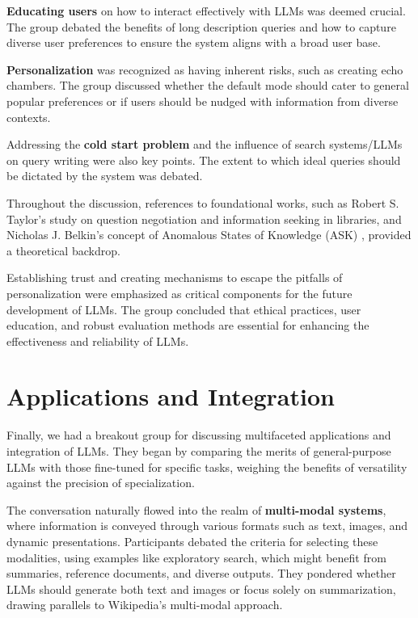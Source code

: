 \documentclass[11pt,dvipdfm]{article}
\begin{document}
{\bf Educating users} on how to interact effectively with LLMs was deemed crucial. The group debated the benefits of long description queries and how to capture diverse user preferences to ensure the system aligns with a broad user base.

{\bf Personalization} was recognized as having inherent risks, such as creating echo chambers. The group discussed whether the default mode should cater to general popular preferences or if users should be nudged with information from diverse contexts.

Addressing the {\bf cold start problem} and the influence of search systems/LLMs on query writing were also key points. The extent to which ideal queries should be dictated by the system was debated.

Throughout the discussion, references to foundational works, such as Robert S. Taylor's study on question negotiation \cite{taylor1968question} and information seeking in libraries, and Nicholas J. Belkin's concept of Anomalous States of Knowledge (ASK) \cite{belkin1980anomalous}, provided a theoretical backdrop.

Establishing trust and creating mechanisms to escape the pitfalls of personalization were emphasized as critical components for the future development of LLMs. The group concluded that ethical practices, user education, and robust evaluation methods are essential for enhancing the effectiveness and reliability of LLMs.

\section{Applications and Integration}
Finally, we had a breakout group for discussing multifaceted applications and integration of LLMs. They began by comparing the merits of general-purpose LLMs with those fine-tuned for specific tasks, weighing the benefits of versatility against the precision of specialization.

The conversation naturally flowed into the realm of {\bf multi-modal systems}, where information is conveyed through various formats such as text, images, and dynamic presentations. Participants debated the criteria for selecting these modalities, using examples like exploratory search, which might benefit from summaries, reference documents, and diverse outputs. They pondered whether LLMs should generate both text and images or focus solely on summarization, drawing parallels to Wikipedia's multi-modal approach.
\end{document}
